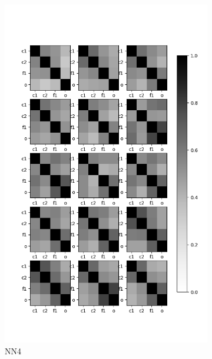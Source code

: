 \documentclass[11pt, twocolumn]{article}
\begin{document}
\begin{figure}
\begin{subfigure}[b]{0.3\textwidth}
		\includegraphics[width=\textwidth]{figs/nn5_sim.png}
		\caption[]%
		{{\small NN4}}    
		\label{fig:nn4}
	\end{subfigure}
	\hfill
	\begin{subfigure}[b]{0.3\textwidth}   
		\centering 

\end{subfigure}
\end{figure}
\end{document}
